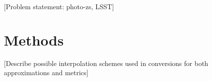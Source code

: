 \documentclass[\docopts]{\docclass}
\begin{document}
[Problem statement: photo-zs, LSST]




%



\section{Methods}
\label{sec:methods}

[Describe possible interpolation schemes used in conversions for both approximations and metrics]

%
%
%
\end{document}
